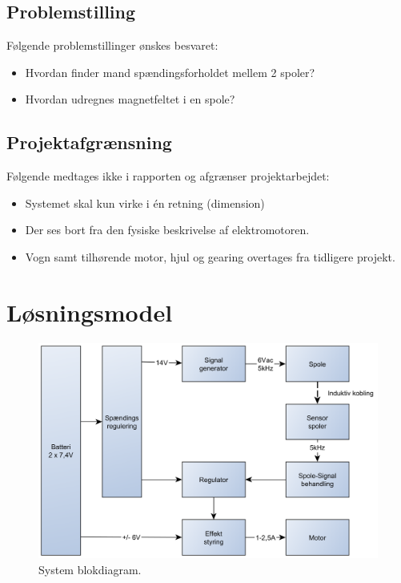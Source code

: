 \subsection{Problemstilling}
Følgende problemstillinger ønskes besvaret:
\begin{itemize}
\item Hvordan finder mand spændingsforholdet mellem 2 spoler?
\item Hvordan udregnes magnetfeltet i en spole?
\end{itemize}

\subsection{Projektafgrænsning}
Følgende medtages ikke i rapporten og afgrænser projektarbejdet:
\begin{itemize}
\item Systemet skal kun virke i én retning (dimension)
\item Der ses bort fra den fysiske beskrivelse af elektromotoren.
\item Vogn samt tilhørende motor, hjul og gearing overtages fra tidligere projekt.
\end{itemize}

\section{Løsningsmodel}
\begin{figure}[h!]
	\centering
	\includegraphics[width=.9\textwidth]{diagram/blokdiagram1.png}
	\caption{System blokdiagram.}
	\label{fig:blockdiagram1}
\end{figure}
\FloatBlock



